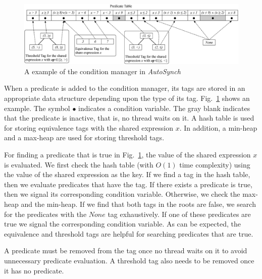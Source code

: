 \documentclass[preprint]{sigplanconf}
\newtheorem{definition}{Definition}
\begin{document}
\begin{figure}[ht!]
  \centering
  \includegraphics[width=180mm]{fig/manager.eps}
  \caption{A example of the condition manager in {\em AutoSynch}}
  \label{fig:mgr}
\end{figure}


When a predicate is added to the condition manager, 
its tags are stored in an appropriate data structure depending upon the type of its tag.
Fig.~\ref{fig:mgr} shows an example. The symbol $\bullet$ indicates 
a condition variable. The gray blank indicates that the predicate is inactive,
that is, no thread waits on it. A hash table is used for
storing equivalence tags with the shared expression $x$. In addition, 
a min-heap and a max-heap are used for storing threshold tags. 



For finding a predicate that is true in Fig.~\ref{fig:mgr}, the value of the
shared expression $x$ is evaluated. We first check the hash table 
(with $O(1)$ time complexity) using the value of the shared expression as the
key. If we find a tag in the hash table, then we evaluate predicates that have
the tag. If there exists a predicate is true, then we signal its corresponding 
condition 
variable. Otherwise, we check the max-heap and the min-heap. If we find that 
both tags in the roots are false, we search for the predicates with the $None$ 
tag exhaustively. If one of these predicates are true
we signal the corresponding condition variable. As can
be expected, the equivalence and threshold tags are helpful for searching 
predicates that are true.   

A predicate must be removed from the tag once no thread waits on 
it to avoid unnecessary predicate evaluation. A threshold tag also needs to be
removed once it has no predicate. 
\end{document}
